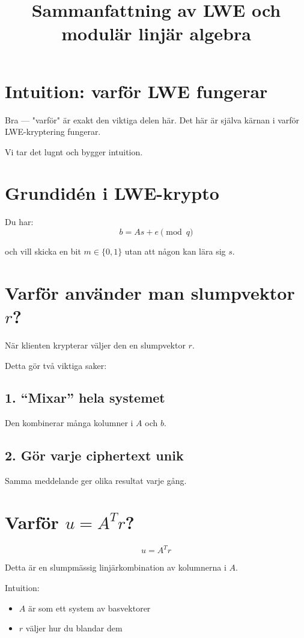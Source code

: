 \documentclass{article}
\title{Sammanfattning av LWE och modulär linjär algebra}
\author{}
\date{}
\begin{document}
\maketitle

\section{Intuition: varför LWE fungerar}

Bra — "varför" är exakt den viktiga delen här. Det här är själva kärnan i varför LWE-kryptering fungerar.

Vi tar det lugnt och bygger intuition.

\section{Grundidén i LWE-krypto}

Du har:
\[
b = As + e \pmod q
\]

och vill skicka en bit $m \in \{0,1\}$ utan att någon kan lära sig $s$.

\section{Varför använder man slumpvektor $r$?}

När klienten krypterar väljer den en slumpvektor $r$.

Detta gör två viktiga saker:

\subsection*{1. “Mixar” hela systemet}
Den kombinerar många kolumner i $A$ och $b$.

\subsection*{2. Gör varje ciphertext unik}
Samma meddelande ger olika resultat varje gång.

\section{Varför $u = A^T r$?}

\[
u = A^T r
\]

Detta är en slumpmässig linjärkombination av kolumnerna i $A$.

Intuition:
\begin{itemize}
\item $A$ är som ett system av basvektorer
\item $r$ väljer hur du blandar dem
\end{itemize}
\end{document}
